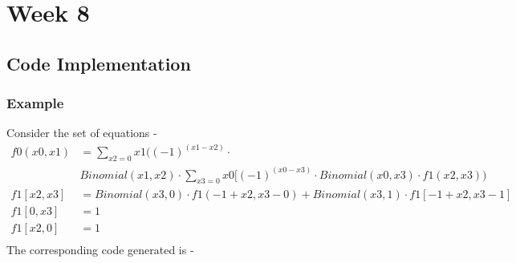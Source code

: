 \documentclass[12pt]{report}
\begin{document}
    \chapter*{Week 8}
    \section*{Code Implementation}
    \subsection*{Example}
    Consider the set of equations - 
    \begin{align*}
        f0(x0,x1)&=\sum_{x2=0}{x1}((-1)^(x1-x2)\cdot\\ & Binomial(x1,x2)\cdot \sum_{x3=0}{x0}[(-1)^(x0-x3)\cdot Binomial(x0,x3)\cdot f1(x2,x3))\\
        f1[x2,x3]&=Binomial(x3,0)\cdot f1(-1+x2,x3-0)+Binomial(x3,1)\cdot f1[-1+x2,x3-1]\\
        f1[0,x3]&=1\\
        f1[x2,0]&=1\\
    \end{align*}
    The corresponding code generated is - 
\end{document}
